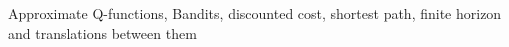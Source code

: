 Approximate Q-functions, Bandits, discounted cost, shortest path, finite horizon and translations between them